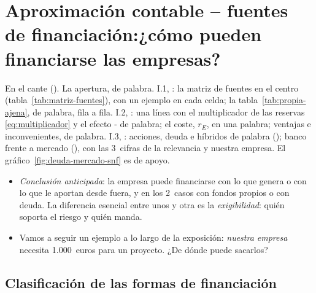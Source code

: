 \documentclass[11pt]{article}
\begin{document}
\section{Aproximación contable – fuentes de financiación:\newline ¿cómo pueden financiarse las empresas?}\label{sec:fuentes}

\begin{notaopositor}
En el cante (). La apertura, de palabra. I.1, : la matriz de fuentes en el centro (tabla~\ref{tab:matriz-fuentes}), con un ejemplo en cada celda; la tabla~\ref{tab:propia-ajena}, de palabra, fila a fila. I.2, : una línea con el multiplicador de las reservas \eqref{eq:multiplicador} y el efecto - de palabra; el coste, $r_E$, en una palabra; ventajas e inconvenientes, de palabra. I.3, : acciones, deuda e híbridos de palabra (); banco frente a mercado (), con las 3~cifras de la relevancia y nuestra empresa. El gráfico~\ref{fig:deuda-mercado-snf} es de apoyo.
\end{notaopositor}

\begin{itemize}
\item \emph{Conclusión anticipada}: la empresa puede financiarse con lo que genera o con lo que le aportan desde fuera, y en los 2~casos con fondos propios o con deuda. La diferencia esencial entre unos y otra es la \emph{exigibilidad}: quién soporta el riesgo y quién manda.
\item Vamos a seguir un ejemplo a lo largo de la exposición: \emph{nuestra empresa} necesita 1.000~euros para un proyecto. ¿De dónde puede sacarlos?
\end{itemize}

\subsection{Clasificación de las formas de financiación}\label{sec:clasificacion}
\end{document}
